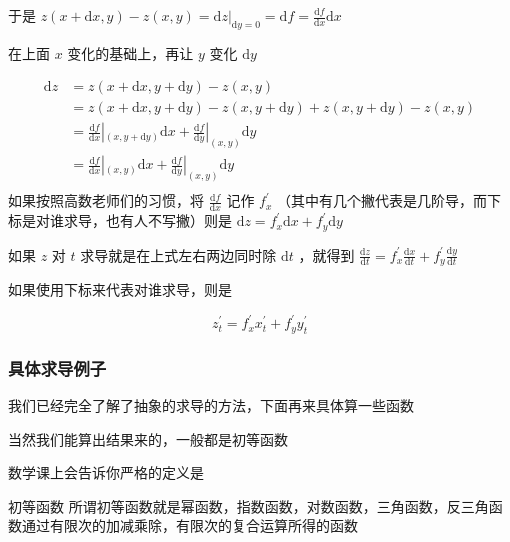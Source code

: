 \documentclass[lang=cn,newtx,10pt,scheme=chinese]{elegantbook}
\begin{document}
\begin{itemize}
        于是 $z(x+\mathrm{d}x,y)-z(x,y)=\mathrm{d}z|_{\mathrm{d}y=0}=\mathrm{d}f=\frac{\mathrm{d}f}{\mathrm{d}x}\mathrm{d}x$

        

        在上面 $x$ 变化的基础上，再让 $y$ 变化 $\mathrm{d}y$ 
        
        \begin{equation}
          \begin{aligned}
          \mathrm{d}z&=z(x+\mathrm{d}x,y+\mathrm{d}y)-z(x,y)\\
          &=z(x+\mathrm{d}x,y+\mathrm{d}y)-z(x,y+\mathrm{d}y)+z(x,y+\mathrm{d}y)-z(x,y) \\
          &=\frac{\mathrm{d}f}{\mathrm{d}x}|_{(x,y+\mathrm{d}y)} \mathrm{d}x+\frac{\mathrm{d}f}{\mathrm{d}y}|_{(x,y)} \mathrm{d}y\\
          &=\frac{\mathrm{d}f}{\mathrm{d}x}|_{(x,y)} \mathrm{d}x+\frac{\mathrm{d}f}{\mathrm{d}y}|_{(x,y)} \mathrm{d}y\\
          \end{aligned}
        \end{equation}
如果按照高数老师们的习惯，将 $\frac{\mathrm{d}f}{\mathrm{d}x}$ 记作 $f^{\prime }_{x} $ （其中有几个撇代表是几阶导，而下标是对谁求导，也有人不写撇）则是
        $\mathrm{d}z=f^{\prime }_{x}\mathrm{d}x+f^{\prime }_{y}\mathrm{d}y$

如果 $z$ 对 $t$ 求导就是在上式左右两边同时除 $\mathrm{d}t$ ，就得到 $\frac{\mathrm{d}z}{\mathrm{d}t}=f^{\prime }_{x}\frac{\mathrm{d}x}{\mathrm{d}t}+f^{\prime }_{y}\frac{\mathrm{d}y}{\mathrm{d}t}$

如果使用下标来代表对谁求导，则是

\begin{equation}
  z^{\prime }_{t}=f^{\prime }_{x}x^{\prime }_{t}+f^{\prime }_{y}y^{\prime }_{t}
\end{equation}
\end{itemize}

\subsubsection{具体求导例子}

我们已经完全了解了抽象的求导的方法，下面再来具体算一些函数

当然我们能算出结果来的，一般都是初等函数

数学课上会告诉你严格的定义是

\begin{definition}{初等函数}
  所谓初等函数就是幂函数，指数函数，对数函数，三角函数，反三角函数通过有限次的加减乘除，有限次的复合运算所得的函数
\end{definition}
\end{document}
